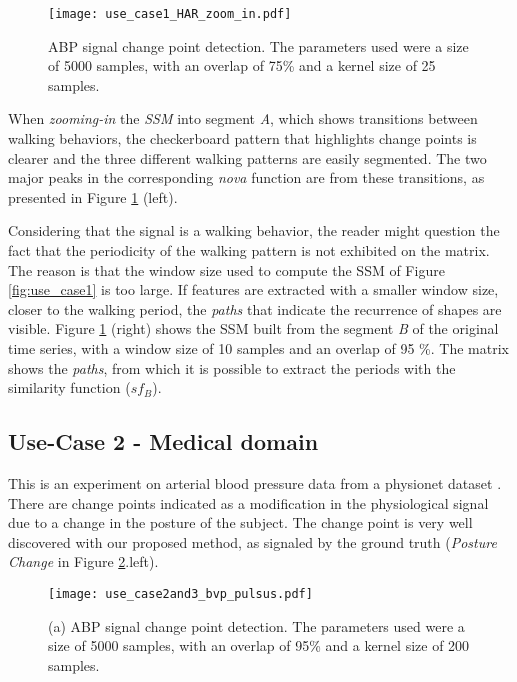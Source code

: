 \begin{figure}
    \centering
    \texttt{[image: use\_case1\_HAR\_zoom\_in.pdf]}
    \caption{ABP signal change point detection. The parameters used were a size of 5000 samples, with an overlap of 75\% and a kernel size of 25 samples.}
    \label{fig:example1_zoom}
\end{figure}

When \textit{zooming-in} the \textit{SSM} into segment \textit{A}, which shows transitions between walking behaviors, the checkerboard pattern that highlights change points is clearer and the three different walking patterns are easily segmented. The two major peaks in the corresponding \textit{nova} function are from these transitions, as presented in Figure \ref{fig:example1_zoom} (left).  
\par
Considering that the signal is a walking behavior, the reader might question the fact that the periodicity of the walking pattern is not exhibited on the matrix. The reason is that the window size used to compute the \gls{SSM} of Figure \ref{fig:use_case1} is too large. If features are extracted with a smaller window size, closer to the walking period, the \textit{paths} that indicate the recurrence of shapes are visible. Figure \ref{fig:example1_zoom} (right) shows the \gls{SSM} built from the segment \textit{B} of the original time series, with a window size of 10 samples and an overlap of 95 \%. The matrix shows the \textit{paths}, from which it is possible to extract the periods with the similarity function ($sf_B$).


\subsection{Use-Case 2 - Medical domain}

This is an experiment on arterial blood pressure data from a physionet dataset \cite{tilt, PhysioNet}. There are change points indicated as a modification in the physiological signal due to a change in the posture of the subject. The change point is very well discovered with our proposed method, as signaled by the ground truth (\textit{Posture Change} in Figure \ref{fig:example2_3}.left).

\begin{figure}
    \centering
    \texttt{[image: use\_case2and3\_bvp\_pulsus.pdf]}
    \caption{(a) ABP signal change point detection. The parameters used were a size of 5000 samples, with an overlap of 95\% and a kernel size of 200 samples.}
    \label{fig:example2_3}
\end{figure}

